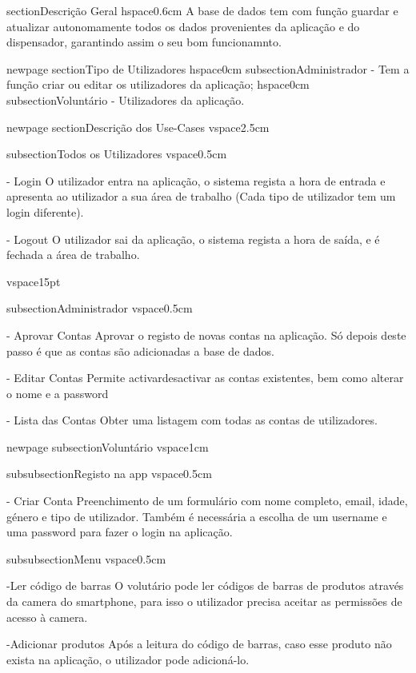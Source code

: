 
section{Descrição Geral}
hspace{0.6cm}
A base de dados tem com função guardar e atualizar autonomamente todos os dados provenientes da aplicação e do dispensador, garantindo assim o seu bom funcionamnto.


newpage
section{Tipo de Utilizadores}
hspace{0cm}
subsection{Administrador}
- Tem a função criar ou editar os utilizadores da aplicação;
hspace{0cm}
subsection{Voluntário}
- Utilizadores da aplicação.


newpage
section{Descrição dos Use-Cases}
vspace{2.5cm}

subsection{Todos os Utilizadores}
vspace{0.5cm}

- Login O utilizador entra na aplicação, o sistema regista a hora de entrada e apresenta ao utilizador a sua área de trabalho (Cada tipo de utilizador tem um login diferente).

- Logout O utilizador sai da aplicação, o sistema regista a hora de saída, e é fechada a área de trabalho. 

vspace{15pt}

subsection{Administrador}
vspace{0.5cm}

- Aprovar Contas Aprovar o registo de novas contas na aplicação. Só depois deste passo é que as contas são adicionadas a base de dados.

- Editar Contas Permite activardesactivar as contas existentes, bem como alterar o nome e a password

- Lista das Contas Obter uma listagem com todas as contas de utilizadores. 

newpage
subsection{Voluntário}
vspace{1cm}

subsubsection{Registo na app}
vspace{0.5cm}

- Criar Conta Preenchimento de um formulário com nome completo, email, idade, género e tipo de utilizador. Também é necessária a escolha de um username e uma password para fazer o login na aplicação.

subsubsection{Menu}
vspace{0.5cm}

-Ler código de barras O volutário pode ler códigos de barras de produtos através da camera do smartphone, para isso o utilizador precisa aceitar as permissões de acesso à camera.

-Adicionar produtos Após a leitura do código de barras, caso esse produto não exista na aplicação, o utilizador pode adicioná-lo.  

